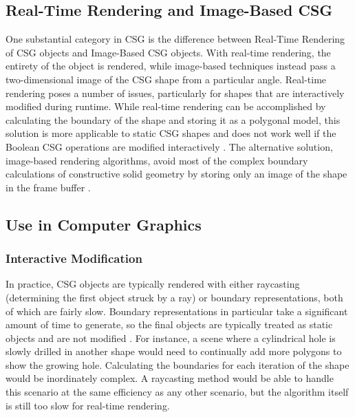 \documentclass[12pt]{article}
\begin{document}
\begin{doublespace}
\subsection{Real-Time Rendering and Image-Based CSG}
One substantial category in CSG is the difference between Real-Time Rendering of CSG objects and Image-Based CSG objects. With real-time rendering, the entirety of the object is rendered, while image-based techniques instead pass a two-dimensional image of the CSG shape from a particular angle. Real-time rendering poses a number of issues, particularly for shapes that are interactively modified during runtime. While real-time rendering can be accomplished by calculating the boundary of the shape and storing it as a polygonal model, this solution is more applicable to static CSG shapes and does not work well if the Boolean CSG operations are modified interactively \cite{open_csg}. The alternative solution, image-based rendering algorithms, avoid most of the complex boundary calculations of constructive solid geometry by storing only an image of the shape in the frame buffer \cite{open_csg}.
\subsection{Use in Computer Graphics}
\subsubsection{Interactive Modification}
In practice, CSG objects are typically rendered with either raycasting (determining the first object struck by a ray) or boundary representations, both of which are fairly slow. Boundary representations in particular take a significant amount of time to generate, so the final objects are typically treated as static objects and are not modified \cite{advanced_opengl}. For instance, a scene where a cylindrical hole is slowly drilled in another shape would need to continually add more polygons to show the growing hole. Calculating the boundaries for each iteration of the shape would be inordinately complex. A raycasting method would be able to handle this scenario at the same efficiency as any other scenario, but the algorithm itself is still too slow for real-time rendering.

\end{doublespace}
\end{document}
